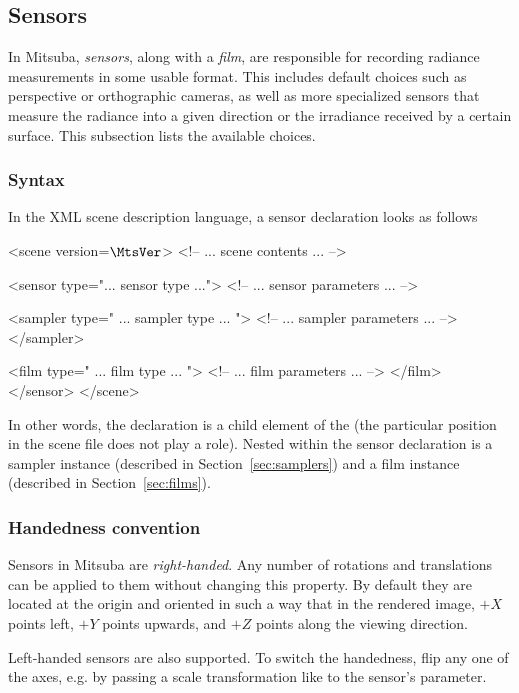 \newpage
\subsection{Sensors}
\label{sec:sensors}
In Mitsuba, \emph{sensors}, along with a \emph{film}, are responsible for recording radiance
measurements in some usable format. This includes default choices such as perspective
or orthographic cameras, as well as more specialized sensors that measure the radiance
into a given direction or the irradiance received by a certain surface. This subsection
lists the available choices.

\subsubsection*{Syntax}
In the XML scene description language, a sensor declaration looks as follows
\begin{xml}
<scene version=$\MtsVer$>
    <!-- ... scene contents ... -->

    <sensor type="... sensor type ...">
        <!-- ... sensor parameters ... -->

        <sampler type=" ... sampler type ... ">
            <!-- ... sampler parameters ... -->
        </sampler>

        <film type=" ... film type ... ">
            <!-- ... film parameters ... -->
        </film>
    </sensor>
</scene>
\end{xml}
In other words, the  declaration is a child element of the  (the particular
position in the scene file does not play a role). Nested within the sensor declaration is a
sampler instance (described in Section~\ref{sec:samplers}) and a film instance (described in
Section~\ref{sec:films}).

\subsubsection*{Handedness convention}
Sensors in Mitsuba are \emph{right-handed}.
Any number of rotations and translations can be applied to them
without changing this property. By default they are located at the
origin and oriented in such a way that in the rendered image, $+X$ points left,
$+Y$ points upwards, and $+Z$ points along the viewing direction.

Left-handed sensors are also supported. To switch the handedness,
flip any one of the axes, e.g. by passing a scale transformation like
 to the sensor's  parameter.
